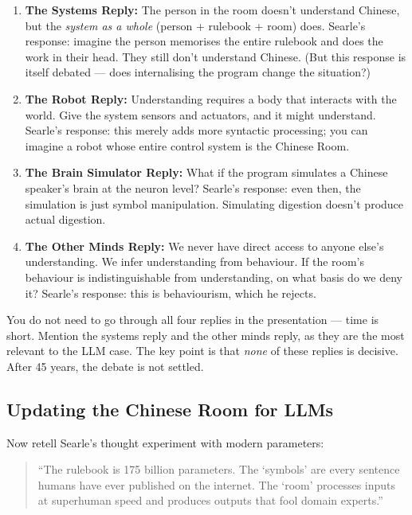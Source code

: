 \documentclass[11pt, a4paper]{article}
\begin{document}
\begin{enumerate}[leftmargin=2em]
  \item \textbf{The Systems Reply:} The person in the room doesn't
    understand Chinese, but the \emph{system as a whole} (person +
    rulebook + room) does. Searle's response: imagine the person
    memorises the entire rulebook and does the work in their head. They
    still don't understand Chinese. (But this response is itself debated
    --- does internalising the program change the situation?)

  \item \textbf{The Robot Reply:} Understanding requires a body that
    interacts with the world. Give the system sensors and actuators, and
    it might understand. Searle's response: this merely adds more
    syntactic processing; you can imagine a robot whose entire control
    system is the Chinese Room.

  \item \textbf{The Brain Simulator Reply:} What if the program simulates
    a Chinese speaker's brain at the neuron level? Searle's response:
    even then, the simulation is just symbol manipulation. Simulating
    digestion doesn't produce actual digestion.

  \item \textbf{The Other Minds Reply:} We never have direct access to
    anyone else's understanding. We infer understanding from behaviour.
    If the room's behaviour is indistinguishable from understanding, on
    what basis do we deny it? Searle's response: this is behaviourism,
    which he rejects.
\end{enumerate}

\begin{speakingnote}
You do not need to go through all four replies in the presentation ---
time is short. Mention the systems reply and the other minds reply, as
they are the most relevant to the LLM case. The key point is that
\emph{none} of these replies is decisive. After 45 years, the debate
is not settled.
\end{speakingnote}


\subsection{Updating the Chinese Room for LLMs}

Now retell Searle's thought experiment with modern parameters:

\begin{quote}
``The rulebook is 175 billion parameters. The `symbols' are every sentence
humans have ever published on the internet. The `room' processes inputs
at superhuman speed and produces outputs that fool domain experts.''
\end{quote}
\end{document}

